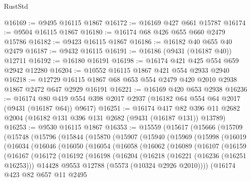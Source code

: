 \begin{lexlean}{RustStd}
\begin{coremodule}
@16169 := @9495 @16115 @1867
@16172 := @16169 @427 @661 @15787
@16174 := @9504 @16115 @1867
@16180 := @16174 @68 @426 @655 @660 @2479 @15786
@16182 := @9423 @16115 @1867
@16186 := @16182 @40 @655 @40 @2479
@16187 := @9432 @16115
@16191 := @16186 (@9431 (@16187 @40)) @12711
@16192 := @16180 @16191
@16198 := @16174 @421 @425 @554 @659 @2942 @12280
@16204 := @10552 @16115 @1867 @421 @554 @2933 @2940
@16218 := @12729 @16115 @1867 @68 @653 @554 @2479 @420 @2010 @2938 @1867 @2472 @647 @2929 @16191
@16221 := @16169 @420 @653 @2938
@16236 := @16174
    @80
    @419
    @554
    @398
    @2017
    @2937
    (@16182 @64 @554 @64 @2017 (@9431 (@16187 @64)) @9617)
@16251 := @16174
    @417
    @82
    @396
    @11
    @2682
    @2004
    (@16182 @131 @396 @131 @2682 (@9431 (@16187 @131)) @13789)
@16253 := @9530 @16115 @1867
@16353 := @15559
    (@15617
      (@15666
        (@15709
          (@15748
            (@15796
              (@15844
                (@15870
                  (@15907
                    (@15940
                      (@15969
                        (@15998
                          (@16019
                            (@16034
                              (@16046
                                (@16050
                                  (@16054
                                    (@16058
                                      (@16062
                                        (@16089
                                          (@16107
                                            (@16159
                                              (@16167
                                                (@16172
                                                  (@16192
                                                    (@16198
                                                      (@16204
                                                        (@16218
                                                          (@16221 (@16236 (@16251 @16253)))
                                                          @14428
                                                          @9553
                                                          @12788
                                                          (@5573 (@10324 @2926 @2010))))
                                                      (@16174
                                                        @423
                                                        @82
                                                        @657
                                                        @11
                                                        @2495

\end{coremodule}
\end{lexlean}

